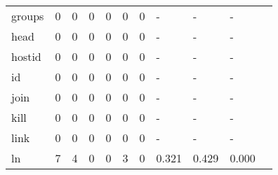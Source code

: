 \begin{longtable}{lp{1.10cm}p{1.10cm}p{1.10cm}p{1.10cm}p{1.10cm}p{1.10cm}p{1.10cm}p{1.10cm}p{1.10cm}p{1.10cm}}
groups    &                      0 &                                  0 &                                 0 &                                0 &                                 0 &                               0 &                              - &                                     - &                                   - \\
head      &                      0 &                                  0 &                                 0 &                                0 &                                 0 &                               0 &                              - &                                     - &                                   - \\
hostid    &                      0 &                                  0 &                                 0 &                                0 &                                 0 &                               0 &                              - &                                     - &                                   - \\
id        &                      0 &                                  0 &                                 0 &                                0 &                                 0 &                               0 &                              - &                                     - &                                   - \\
join      &                      0 &                                  0 &                                 0 &                                0 &                                 0 &                               0 &                              - &                                     - &                                   - \\
kill      &                      0 &                                  0 &                                 0 &                                0 &                                 0 &                               0 &                              - &                                     - &                                   - \\
link      &                      0 &                                  0 &                                 0 &                                0 &                                 0 &                               0 &                              - &                                     - &                                   - \\
ln        &                      7 &                                  4 &                                 0 &                                0 &                                 3 &                               0 &                          0.321 &                                 0.429 &                               0.000 \\

\end{longtable}

